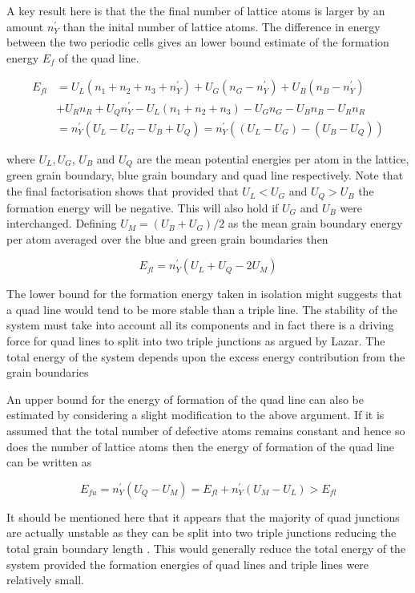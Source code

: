 \documentclass[12pt,a4paper]{book}
\begin{document}
A key result here is that the the final number of lattice atoms is larger by an amount $n_Y^{\prime}$ than the inital number of lattice atoms. The difference in energy between the two periodic cells gives an lower bound estimate of the formation energy $E_f$ of the quad line.

\begin{align*}
 E_{fl} &= U_L(n_1+n_2+n_3+n_Y^{\prime}) + U_G(n_G - n_Y^{\prime})
+ U_B(n_B - n_Y^{\prime}) \\ 
&+ U_R n_R + U_Q n_Y^{\prime}
- U_L(n_1+n_2+n_3) - U_G n_G - U_B n_B - U_R n_R  
\\ 
&=  n_Y^{\prime}(U_L - U_G - U_B + U_Q) = n_Y^{\prime}((U_L - U_G) - (U_B - U_Q)) 
\end{align*}

where $U_L, U_G$, $U_B$ and $U_Q$ are the mean potential energies per atom in the lattice, green grain boundary, blue grain boundary
and quad line respectively. Note that the final factorisation shows that provided that $U_L < U_G$ and $U_Q > U_B$ the formation energy will be negative. This will also hold if $U_G$ and $U_B$ were interchanged. Defining $U_M = (U_B + U_G)/2$ as the mean grain boundary energy per atom averaged over the blue and green grain boundaries then

\[E_{fl} =  n_Y^{\prime}(U_L + U_Q - 2U_M)\]

The lower bound for the formation energy taken in isolation might suggests that a quad line would tend to be more stable than a triple line. The stability of the system must take into account all its components and in fact there is a driving force for quad lines to split into two triple junctions as argued by Lazar. The total energy of the system depends upon the excess energy contribution from the grain boundaries


An upper bound for the energy of formation of the quad line can also be estimated by considering a slight modification to the above argument. If it is assumed that the total number of defective atoms remains constant and hence so does the number of lattice atoms then the energy of formation of the quad line can
be written as

\[E_{fu} =  n_Y^{\prime}(U_Q - U_M) = E_{fl} + n_Y^{\prime}(U_M - U_L) > E_{fl} \]

It should be mentioned here that it appears that the majority of quad junctions are actually unstable as they can be split into two triple junctions reducing the total grain boundary length \cite{Lazar2011}. This would generally reduce the total energy of the system provided the formation energies of quad lines and triple lines were relatively small. 
\end{document}
